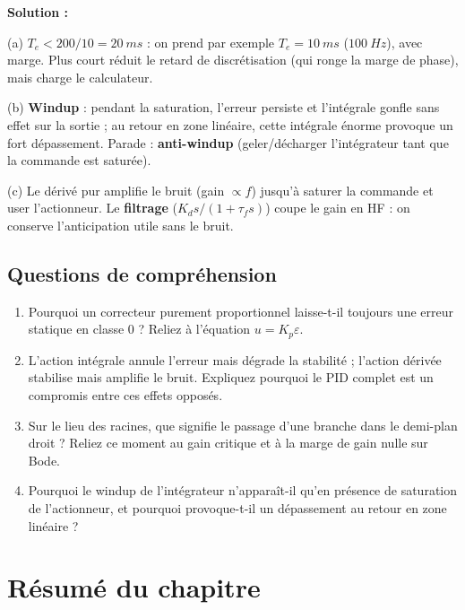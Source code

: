 \documentclass[12pt,a4paper,twoside]{book}
\begin{document}
\begin{pratique}
\textbf{Solution :}

(a) $T_e < 200/10 = \SI{20}{ms}$ : on prend par exemple $T_e = \SI{10}{ms}$ ($\SI{100}{Hz}$), avec marge. Plus court réduit le retard de discrétisation (qui ronge la marge de phase), mais charge le calculateur.

(b) \textbf{Windup} : pendant la saturation, l'erreur persiste et l'intégrale gonfle sans effet sur la sortie ; au retour en zone linéaire, cette intégrale énorme provoque un fort dépassement. Parade : \textbf{anti-windup} (geler/décharger l'intégrateur tant que la commande est saturée).

(c) Le dérivé pur amplifie le bruit (gain $\propto f$) jusqu'à saturer la commande et user l'actionneur. Le \textbf{filtrage} ($K_d s/(1+\tau_f s)$) coupe le gain en HF : on conserve l'anticipation utile sans le bruit.
\end{pratique}

\subsection*{Questions de compréhension}

\begin{enumerate}[nosep]
\item Pourquoi un correcteur purement proportionnel laisse-t-il toujours une erreur statique en classe 0 ? Reliez à l'équation $u = K_p\varepsilon$.
\item L'action intégrale annule l'erreur mais dégrade la stabilité ; l'action dérivée stabilise mais amplifie le bruit. Expliquez pourquoi le PID complet est un compromis entre ces effets opposés.
\item Sur le lieu des racines, que signifie le passage d'une branche dans le demi-plan droit ? Reliez ce moment au gain critique et à la marge de gain nulle sur Bode.
\item Pourquoi le windup de l'intégrateur n'apparaît-il qu'en présence de saturation de l'actionneur, et pourquoi provoque-t-il un dépassement au retour en zone linéaire ?
\end{enumerate}

\section*{Résumé du chapitre}
\end{document}
